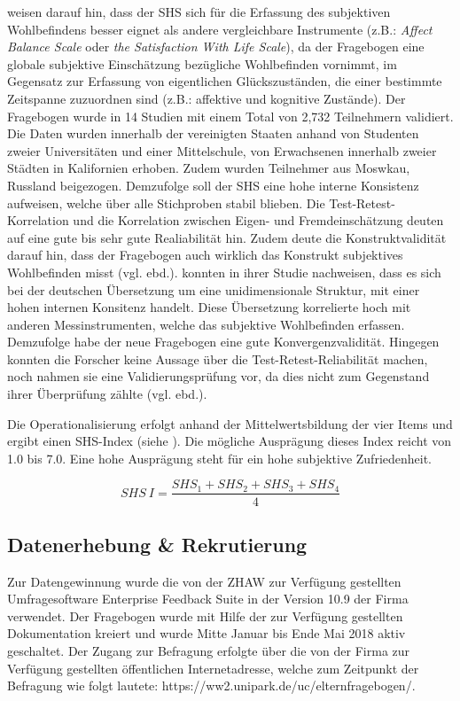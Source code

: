  weisen darauf hin, dass der SHS sich für die Erfassung des subjektiven Wohlbefindens besser eignet als andere vergleichbare Instrumente (z.B.: \textit{Affect Balance Scale} oder \textit{the Satisfaction With Life Scale}), da der Fragebogen eine globale subjektive Einschätzung bezügliche Wohlbefinden vornimmt, im Gegensatz zur Erfassung von eigentlichen Glückszuständen, die einer bestimmte Zeitspanne zuzuordnen sind (z.B.: affektive und kognitive Zustände). Der Fragebogen wurde in 14 Studien mit einem Total von 2,732 Teilnehmern validiert. Die Daten wurden innerhalb der vereinigten Staaten anhand von Studenten zweier Universitäten und einer Mittelschule, von Erwachsenen innerhalb zweier Städten in Kalifornien   erhoben. Zudem wurden Teilnehmer aus Moswkau, Russland beigezogen. Demzufolge soll der SHS eine hohe interne Konsistenz aufweisen, welche über alle Stichproben stabil blieben. Die Test-Retest-Korrelation und die Korrelation zwischen Eigen- und Fremdeinschätzung deuten auf eine gute bis sehr gute Realiabilität hin. 
Zudem deute die Konstruktvalidität darauf hin, dass der Fragebogen auch wirklich das Konstrukt subjektives Wohlbefinden misst (vgl. ebd.).  konnten in ihrer Studie nachweisen, dass es sich bei der deutschen Übersetzung um eine unidimensionale Struktur, mit einer hohen internen Konsitenz handelt. Diese Übersetzung korrelierte hoch mit anderen Messinstrumenten, welche das subjektive Wohlbefinden erfassen. Demzufolge habe der neue Fragebogen eine gute Konvergenzvalidität. Hingegen konnten die Forscher keine Aussage über die Test-Retest-Reliabilität machen, noch nahmen sie eine Validierungsprüfung vor, da dies nicht zum Gegenstand ihrer Überprüfung zählte (vgl. ebd.).

Die Operationalisierung erfolgt anhand der Mittelwertsbildung der vier Items \cite{Lyubomirsky1999} und ergibt einen SHS-Index (siehe ). Die mögliche Ausprägung dieses Index reicht von 1.0 bis 7.0. Eine hohe Ausprägung steht für ein hohe subjektive Zufriedenheit.

\begin{equation}\label{eq:SHS}
    SHS~I=\frac{SHS_{1}+SHS_{2}+SHS_{3}+SHS_{4}}{4}
\end{equation}

\subsection{Datenerhebung \& Rekrutierung}
Zur Datengewinnung wurde die von der ZHAW zur Verfügung gestellten Umfragesoftware Enterprise Feedback Suite in der Version 10.9 der Firma  verwendet. Der Fragebogen wurde mit Hilfe der zur Verfügung gestellten Dokumentation kreiert \cite{EFS2016} und wurde Mitte Januar bis Ende Mai 2018 aktiv geschaltet.  Der Zugang zur Befragung erfolgte über die von der Firma  zur Verfügung gestellten öffentlichen Internetadresse, welche zum Zeitpunkt der Befragung wie folgt lautete: https://ww2.unipark.de/uc/elternfragebogen/.

